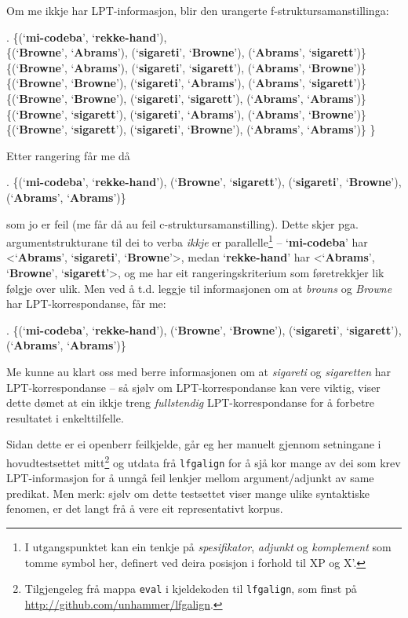 \documentclass[12pt,a4paper,oneside,draft]{report}
\newcommand{\p}[1]{`\textbf{#1}'}
\begin{document}
 Om me ikkje har LPT-informasjon, blir den urangerte
 f-struktursamanstillinga:

\ex. \{(\p{mi-codeba}, \p{rekke-hand}), \\
 \{(\p{Browne}, \p{Abrams}),   (\p{sigareti}, \p{Browne}),   (\p{Abrams}, \p{sigarett})\} \\
 \{(\p{Browne}, \p{Abrams}),   (\p{sigareti}, \p{sigarett}), (\p{Abrams}, \p{Browne})\} \\
 \{(\p{Browne}, \p{Browne}),   (\p{sigareti}, \p{Abrams}),   (\p{Abrams}, \p{sigarett})\} \\
 \{(\p{Browne}, \p{Browne}),   (\p{sigareti}, \p{sigarett}), (\p{Abrams}, \p{Abrams})\} \\
 \{(\p{Browne}, \p{sigarett}), (\p{sigareti}, \p{Abrams}),   (\p{Abrams}, \p{Browne})\} \\
 \{(\p{Browne}, \p{sigarett}), (\p{sigareti}, \p{Browne}),   (\p{Abrams}, \p{Abrams})\} \}

 Etter rangering får me då 

\ex. \{(\p{mi-codeba}, \p{rekke-hand}), (\p{Browne}, \p{sigarett}), (\p{sigareti}, \p{Browne}), (\p{Abrams}, \p{Abrams})\} 

 som jo er feil (me får då au feil c-struktursamanstilling). Dette
 skjer pga. argumentstrukturane til dei to verba \emph{ikkje} er
 parallelle\footnote{I utgangspunktet kan ein tenkje på \emph{spesifikator}, \emph{adjunkt}
        og \emph{komplement} som tomme symbol her, definert ved deira
        posisjon i forhold til XP og X'. } -- \p{mi-codeba} har <\p{Abrams}, \p{sigareti},
 \p{Browne}>, medan \p{rekke-hand} har <\p{Abrams}, \p{Browne},
 \p{sigarett}>, og me har eit rangeringskriterium som føretrekkjer lik
 følgje over ulik. Men ved å t.d. leggje til informasjonen om at
 \emph{brouns} og \emph{Browne} har LPT-korrespondanse, får me:

\ex. \{(\p{mi-codeba}, \p{rekke-hand}), (\p{Browne}, \p{Browne}), (\p{sigareti}, \p{sigarett}), (\p{Abrams}, \p{Abrams})\}

 Me kunne au klart oss med berre informasjonen om at \emph{sigareti} og
 \emph{sigaretten} har LPT-korrespondanse -- så sjølv om LPT-korrespondanse
 kan vere viktig, viser dette dømet at ein ikkje treng \emph{fullstendig}
 LPT-korrespondanse for å forbetre resultatet i enkelttilfelle.

 Sidan dette er ei openberr feilkjelde, går eg her manuelt gjennom
 setningane i hovudtestsettet mitt\footnote{Tilgjengeleg frå mappa \texttt{eval} i kjeldekoden til \texttt{lfgalign},
        som finst på \href{http://github.com/unhammer/lfgalign}{http://github.com/unhammer/lfgalign}. } og utdata frå \texttt{lfgalign} for
 å sjå kor mange av dei som krev LPT-informasjon for å unngå feil
 lenkjer mellom argument/adjunkt av same predikat. Men merk: sjølv om
 dette testsettet viser mange ulike syntaktiske fenomen, er det langt
 frå å vere eit representativt korpus.
\end{document}
